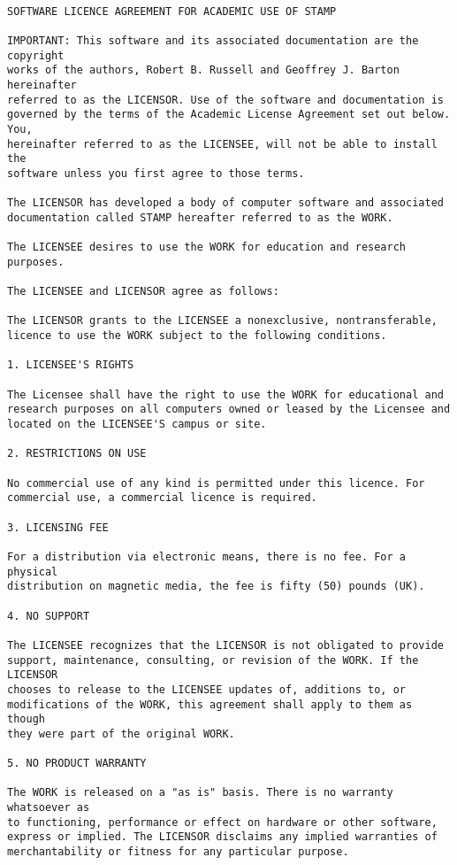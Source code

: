 \begin{verbatim}

SOFTWARE LICENCE AGREEMENT FOR ACADEMIC USE OF STAMP

IMPORTANT: This software and its associated documentation are the copyright
works of the authors, Robert B. Russell and Geoffrey J. Barton hereinafter
referred to as the LICENSOR. Use of the software and documentation is
governed by the terms of the Academic License Agreement set out below. You,
hereinafter referred to as the LICENSEE, will not be able to install the
software unless you first agree to those terms.

The LICENSOR has developed a body of computer software and associated
documentation called STAMP hereafter referred to as the WORK.

The LICENSEE desires to use the WORK for education and research purposes.

The LICENSEE and LICENSOR agree as follows:

The LICENSOR grants to the LICENSEE a nonexclusive, nontransferable,
licence to use the WORK subject to the following conditions.

1. LICENSEE'S RIGHTS

The Licensee shall have the right to use the WORK for educational and
research purposes on all computers owned or leased by the Licensee and
located on the LICENSEE'S campus or site.

2. RESTRICTIONS ON USE

No commercial use of any kind is permitted under this licence. For
commercial use, a commercial licence is required.

3. LICENSING FEE

For a distribution via electronic means, there is no fee. For a physical
distribution on magnetic media, the fee is fifty (50) pounds (UK).

4. NO SUPPORT

The LICENSEE recognizes that the LICENSOR is not obligated to provide
support, maintenance, consulting, or revision of the WORK. If the LICENSOR
chooses to release to the LICENSEE updates of, additions to, or
modifications of the WORK, this agreement shall apply to them as though
they were part of the original WORK.

5. NO PRODUCT WARRANTY

The WORK is released on a "as is" basis. There is no warranty whatsoever as
to functioning, performance or effect on hardware or other software,
express or implied. The LICENSOR disclaims any implied warranties of
merchantability or fitness for any particular purpose.


\end{verbatim}
